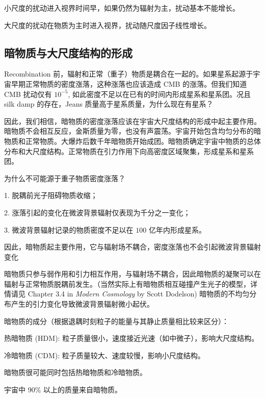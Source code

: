 \documentclass[../天体物理基础.tex]{subfiles}
\begin{document}
小尺度的扰动进入视界时间早，如果仍然为辐射为主，扰动基本不能增长。

大尺度的扰动在物质为主时进入视界，扰动随尺度因子线性增长。

\subsection{暗物质与大尺度结构的形成}
Recombination 前，辐射和正常（重子）物质是耦合在一起的。如果星系起源于宇宙早期正常物质的密度涨落，这种涨落也应该造成 CMB 的涨落。但我们知道 CMB 扰动仅有 $10^{-5}$, 如此密度不足以在已有的时间内形成星系和星系团。况且 silk damp 的存在，Jeans 质量高于星系质量，为什么现在有星系？

因此，我们相信，暗物质的密度涨落应该在宇宙大尺度结构的形成中起主要作用。暗物质不会相互反应，金斯质量为零，也没有声震荡。宇宙开始包含均匀分布的暗物质和正常物质。大爆炸后数千年暗物质开始成团。暗物质确定宇宙中物质的总体分布和大尺度结构。正常物质在引力作用下向高密度区域聚集，形成星系和星系团。

为什么不可能源于重子物质密度涨落？

1. 脱耦前光子阻碍物质收缩；

2. 涨落引起的变化在微波背景辐射仅表现为千分之一变化；

3. 微波背景辐射记录的物质密度不足以在 $100$ 亿年内形成星系。

因此，暗物质起主要作用，它与辐射场不耦合，密度涨落也不会引起微波背景辐射变化

暗物质只参与弱作用和引力相互作用，与辐射场不耦合，因此暗物质的凝聚可以在辐射与正常物质脱耦前发生。（当然实际上有暗物质相互碰撞产生光子的模型，详情请见 Chapter 3.4 in \textit{Modern Cosmology} by Scott Dodelson) 暗物质的不均匀分布产生的引力变化导致微波背景辐射微小起伏。

暗物质的成分（根据退耦时刻粒子的能量与其静止质量相比较来区分）：

热暗物质 (HDM): 粒子质量很小，速度接近光速（如中微子），影响大尺度结构。

冷暗物质 (CDM): 粒子质量较大、速度较慢，影响小尺度结构。

暗物质很可能同时包括热暗物质和冷暗物质。

宇宙中 90\% 以上的质量来自暗物质。

\end{document}
